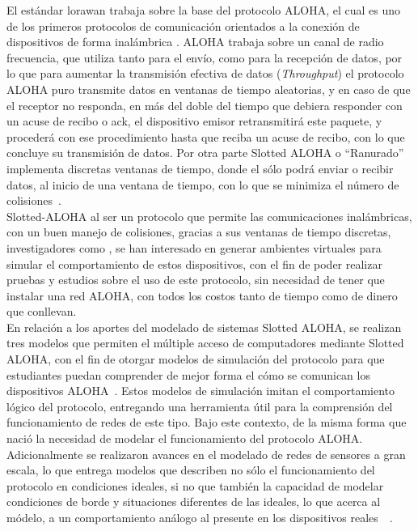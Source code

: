 \begin{justify}
El estándar \gls{lorawan} trabaja sobre la base del protocolo ALOHA, el cual es uno de los primeros protocolos de comunicación orientados a la conexión de dispositivos de forma inalámbrica . ALOHA trabaja sobre un canal de radio frecuencia, que utiliza tanto para el envío, como para la recepción de datos, por lo que para aumentar la transmisión efectiva de datos (\textit{Throughput}) el protocolo ALOHA puro transmite datos en ventanas de tiempo aleatorias, y en caso de que el receptor no responda, en más del doble del tiempo que debiera responder con un acuse de recibo o \gls{ack}, el dispositivo emisor retransmitirá este paquete, y procederá con ese procedimiento hasta que reciba un acuse de recibo, con lo que concluye su transmisión de datos. Por otra parte Slotted ALOHA  o ``Ranurado'' implementa discretas ventanas de tiempo, donde el sólo podrá enviar o recibir datos, al inicio de una ventana de tiempo, con lo que se minimiza el número de colisiones~\cite{NORMAN}.\\
Slotted-ALOHA al ser un protocolo que permite las comunicaciones inalámbricas, con un buen manejo de colisiones, gracias a sus ventanas de tiempo discretas, investigadores como \cite{Abdullah}, se han interesado en generar ambientes virtuales para simular el comportamiento de estos dispositivos, con el fin de poder realizar pruebas y estudios sobre el uso de este protocolo, sin necesidad de tener que instalar una red ALOHA, con todos los costos tanto de tiempo como de dinero que conllevan.\\
En relación a los aportes del modelado de sistemas Slotted ALOHA, se realizan tres modelos que permiten el múltiple acceso de computadores mediante Slotted ALOHA, con el fin de otorgar modelos de simulación del protocolo para que estudiantes puedan comprender de mejor forma el cómo se comunican los dispositivos ALOHA~\cite{Abdullah}. Estos modelos de simulación imitan el comportamiento lógico del protocolo, entregando una herramienta útil para la comprensión del funcionamiento de redes de este tipo. Bajo este contexto, de la misma forma que nació la necesidad de modelar el funcionamiento del protocolo ALOHA. Adicionalmente se realizaron avances en el modelado de redes de sensores a gran escala, lo que entrega modelos que describen no sólo el funcionamiento del protocolo en condiciones ideales, si no que también la capacidad de modelar condiciones de borde y situaciones diferentes de las ideales, lo que acerca al módelo, a un comportamiento análogo al presente en los dispositivos reales~\cite{simulato}~\cite{simubook}.\\

\end{justify}
